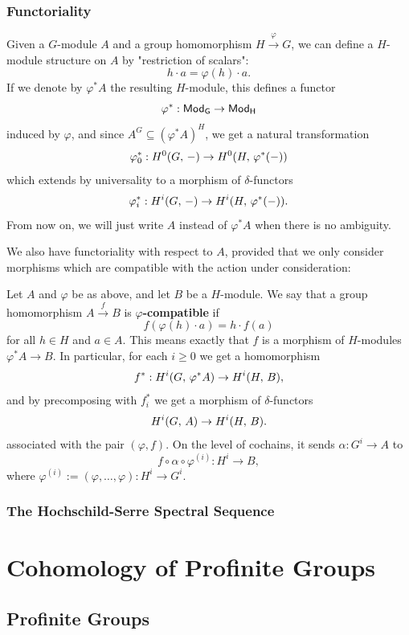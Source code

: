 \documentclass[a4paper, oneside]{memoir}
\begin{document}
\subsection{Functoriality}

Given a $G$-module $A$ and a group homomorphism $ H\overset{\varphi}{\to} G$, we can define a $H$-module structure on $A$ by "restriction of scalars":
\[
    h\cdot a = \varphi(h)\cdot a.
\]
If we denote by $\varphi^* A$ the resulting $H$-module, this defines a functor
\[
    \varphi^* : \mathsf{Mod}_\mathsf{G}\to\mathsf{Mod}_\mathsf{H}
\]
induced by $\varphi$, and since $A^G\subseteq (\varphi^*A)^H$, we get a natural transformation
\[
    \varphi_0^*: H^{0}( G, \, - )\to H^{0}( H, \, \varphi^*(-) )
\]
which extends by universality to a morphism of $\delta$-functors
\[
    \varphi_i^*: H^{i}( G, \, - )\to H^{i}( H, \, \varphi^*(-) )
.\]
From now on, we will just write $A$ instead of $\varphi^*A$ when there is no ambiguity.

We also have functoriality with respect to $A$, provided that we only consider morphisms which are compatible with the action under consideration:

\begin{definition}
    Let $A$ and $\varphi$ be as above, and let $B$ be a $H$-module. We say that a group homomorphism $A\overset{f}{\to} B$ is \textbf{$\varphi$-compatible} if
    \[
      f(\varphi(h)\cdot a)=h\cdot f(a)
    \]
    for all $h\in H$ and $a\in A$. This means exactly that $f$ is a morphism of $H$-modules $\varphi^*A\to B$. In particular, for each $i\geq 0$ we get a homomorphism
    \[
        f^*: H^{i}( G, \, \varphi^*A )\to H^{i}( H, \, B ),
    \]
    and by precomposing with $f_i^*$ we get a morphism of $\delta$-functors
    \[
        H^{i}( G, \, A )\to H^{i}( H, \, B ).
    \]
    associated with the pair $(\varphi,f)$. On the level of cochains, it sends $\alpha: G^i\to A$ to
    \[ f \circ \alpha \circ \varphi^{(i)}: H^i\to B, \]
    where \( \varphi^{(i)} := (\varphi,\ldots,\varphi) : H^i\to G^i \).
\end{definition}

\subsection{The Hochschild-Serre Spectral Sequence}

\chapter{Cohomology of Profinite Groups}

\section{Profinite Groups}
\end{document}
